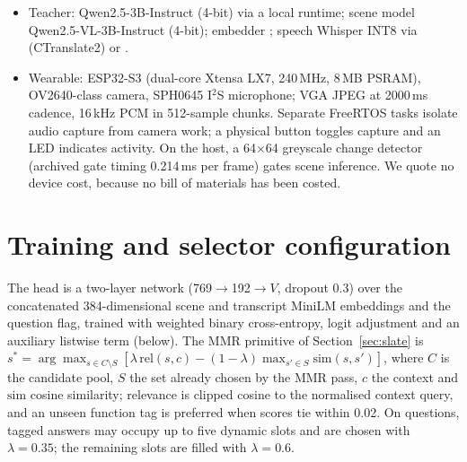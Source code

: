 \begin{itemize}
\item Teacher: Qwen2.5-3B-Instruct (4-bit) via a local runtime; scene model
Qwen2.5-VL-3B-Instruct (4-bit); embedder ; speech
Whisper  INT8 via  (CTranslate2) or
.
\item Wearable: ESP32-S3 (dual-core Xtensa LX7, 240\,MHz, 8\,MB PSRAM),
OV2640-class camera, SPH0645 I$^2$S microphone; VGA JPEG at 2000\,ms cadence,
16\,kHz PCM in 512-sample chunks. Separate FreeRTOS tasks isolate audio capture from camera work; a physical button toggles capture and an LED indicates activity. On the host, a 64$\times$64 greyscale change detector (archived gate timing 0.214\,ms per frame) gates scene inference. We quote no device cost, because no bill of materials has been costed.
\end{itemize}

\section{Training and selector configuration}\label{app:train}
The head is a two-layer network (769$\rightarrow$192$\rightarrow V$, dropout 0.3) over the concatenated 384-dimensional scene and transcript MiniLM embeddings and the question flag, trained with weighted binary cross-entropy, logit adjustment and an auxiliary listwise term (below). The MMR primitive of Section~\ref{sec:slate} is $s^*=\arg\max_{s\in C\setminus S}[\lambda\,\mathrm{rel}(s,c)-(1-\lambda)\max_{s'\in S}\mathrm{sim}(s,s')]$, where $C$ is the candidate pool, $S$ the set already chosen by the MMR pass, $c$ the context and $\mathrm{sim}$ cosine similarity; relevance is clipped cosine to the normalised context query, and an unseen function tag is preferred when scores tie within 0.02. On questions, tagged answers may occupy up to five dynamic slots and are chosen with $\lambda=0.35$; the remaining slots are filled with $\lambda=0.6$.

